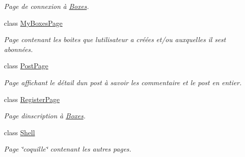 \begin{DoxyCompactItemize}
\begin{DoxyCompactList}\small\item\em Page de connexion à \hyperlink{namespace_boxes}{Boxes}. \end{DoxyCompactList}\item 
class \hyperlink{class_boxes_1_1_views_1_1_my_boxes_page}{My\+Boxes\+Page}
\begin{DoxyCompactList}\small\item\em Page contenant les boites que l\textquotesingle{}utilisateur a créées et/ou auxquelles il s\textquotesingle{}est abonnées. \end{DoxyCompactList}\item 
class \hyperlink{class_boxes_1_1_views_1_1_post_page}{Post\+Page}
\begin{DoxyCompactList}\small\item\em Page affichant le détail d\textquotesingle{}un post à savoir les commentaire et le post en entier. \end{DoxyCompactList}\item 
class \hyperlink{class_boxes_1_1_views_1_1_register_page}{Register\+Page}
\begin{DoxyCompactList}\small\item\em Page d\textquotesingle{}inscription à \hyperlink{namespace_boxes}{Boxes}. \end{DoxyCompactList}\item 
class \hyperlink{class_boxes_1_1_views_1_1_shell}{Shell}
\begin{DoxyCompactList}\small\item\em Page \char`\"{}coquille\char`\"{} contenant les autres pages. \end{DoxyCompactList}\end{DoxyCompactItemize}

